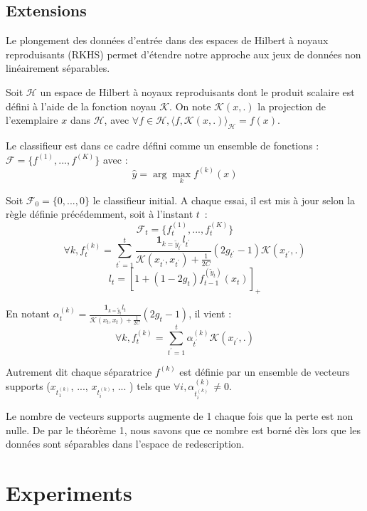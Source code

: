 \documentclass[preprint,12pt,authoryear]{elsarticle}
\begin{document}
\subsection{Extensions}
Le plongement des données d'entrée dans des espaces de Hilbert à noyaux reproduisants (RKHS) permet d'étendre notre approche aux jeux de données non linéairement séparables. 

Soit $\mathcal{H}$ un espace de Hilbert à noyaux reproduisants dont le produit scalaire est défini à l'aide de la fonction noyau $\mathcal{K}$. On note $\mathcal{K}(x,.)$ la projection de l'exemplaire $x$ dans $\mathcal{H}$, avec $\forall f \in \mathcal{H}, \langle f,\mathcal{K}(x,.)\rangle_\mathcal{H} = f(x) $.


Le classifieur est dans ce cadre défini comme un ensemble de fonctions : $\mathcal{F} = \{f^{(1)}, ..., f^{(K)}\}$ avec :
$$\hat{y} = \arg \max_k f^{(k)}(x)$$

Soit $\mathcal{F}_0=\{0, ..., 0\}$ le classifieur initial. A chaque essai, il est mis à jour selon la règle définie précédemment, soit à l'instant $t$~:
$$\mathcal{F}_t = \{f^{(1)}_t, ..., f^{(K)}_t\}$$
$$\forall k, f^{(k)}_t = \sum_{t^\prime = 1} ^t  \frac {\mathbf{1}_{k=\tilde{y}_{t^\prime}}l_{t^\prime}}{\mathcal{K}(x_{t^\prime},x_{t^\prime})+\frac{1}{2C}} (2g_{t^\prime} - 1)\mathcal{K}(x_{t^\prime},.)$$
$$ l_t = [1 + (1-2g_t) f_{t-1}^{(\tilde{y}_t)}(x_t)]_+$$

En notant $\alpha_t^{(k)} = \frac {\mathbf{1}_{k=\tilde{y}_{t}}l_{t}}{\mathcal{K}(x_{t},x_{t})+\frac{1}{2C}} (2g_{t} - 1)$, il vient :
$$\forall k, f^{(k)}_t = \sum_{t^\prime = 1} ^t \alpha_{t^\prime}^{(k)} \mathcal{K}(x_{t^\prime},.)$$

Autrement dit chaque séparatrice $f^{(k)}$ est définie par un ensemble de vecteurs supports ($x_{t_1^{(k)}}$, ..., $x_{t_i^{(k)}}$, ...  ) tels que $\forall i, \alpha_{t_i^{(k)}}^{(k)} \neq 0$.


Le nombre de vecteurs supports augmente de 1 chaque fois que la perte est non nulle. De par le théorème 1, nous savons que ce nombre est borné dès lors que les données sont séparables dans l'espace de redescription. 





\section{Experiments}
\end{document}
